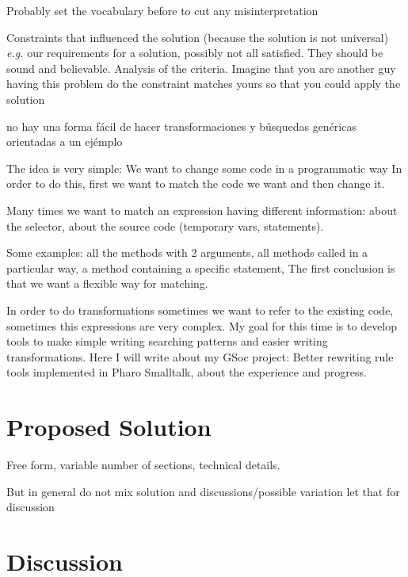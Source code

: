 \documentclass{article}
\begin{document}
Probably set the vocabulary before to cut any misinterpretation

Constraints that influenced the solution (because the solution is not
universal) \emph{e.g.} our requirements for a solution, possibly not all
satisfied. They should be sound and believable. Analysis of the criteria.
Imagine that you are another guy having this problem do the constraint
matches yours so that you could apply the solution

no hay una forma fácil de hacer transformaciones y búsquedas genéricas orientadas a un ejémplo

The idea is very simple:
We want to change some code in a programmatic way
In order to do this, first we want to match the code we want and then change it.

Many times we want to match an expression having different information: about the selector, about the source code (temporary vars, statements).

Some examples:
all the methods with 2 arguments,
all methods called in a particular way,
a method containing a specific statement,
The first conclusion is that we want a flexible way for matching.


In order to do transformations sometimes we want to refer to the existing code, sometimes this expressions are very complex.
My goal for this time is to develop tools to make simple writing searching patterns and easier writing transformations.
Here I will write about my GSoc project: Better rewriting rule tools implemented in Pharo Smalltalk, about the experience and progress.


\section{Proposed Solution}
\label{sec:contribution}
Free form, variable number of sections, technical details.

But in general do not mix solution and discussions/possible variation
let that for discussion



\section{Discussion}
\label{sec:discussion}
\end{document}
